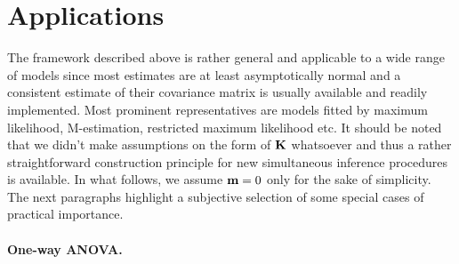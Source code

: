 \documentclass[12pt]{article}
\begin{document}
\section{Applications} \label{applications}

The framework described above is rather general and applicable 
to a wide range of models since most estimates are at least asymptotically
normal and a consistent estimate of their covariance matrix
is usually available and readily implemented. Most prominent
representatives are models fitted by maximum likelihood, M-estimation,
restricted maximum likelihood etc. 
It should be noted that we didn't make assumptions on the form
of $\mathbf{K}$ whatsoever and thus a rather straightforward construction 
principle for new simultaneous inference procedures is available. In
what follows, we assume $\mathbf{m} = 0$ only for the sake of simplicity.
The next paragraphs highlight a subjective selection of 
some special cases of practical importance.

\paragraph{One-way ANOVA.}
\end{document}
